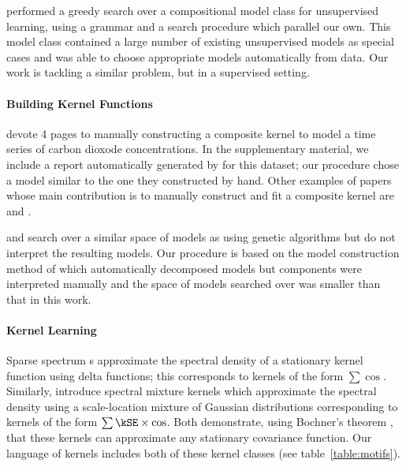 \citet{Grosse2012-zi} performed a greedy search over a compositional model class for unsupervised learning, using a grammar and a search procedure which parallel our own.
This model class contained a large number of existing unsupervised models as special cases and was able to choose appropriate models automatically from data.
Our work is tackling a similar problem, but in a supervised setting.


\paragraph{Building Kernel Functions}
\cite{rasmussen38gaussian} devote 4 pages to manually constructing a composite kernel to model a time series of carbon dioxode concentrations.
In the supplementary material, we include a report automatically generated by \procedurename{} for this dataset; our procedure chose a model similar to the one they constructed by hand.
Other examples of papers whose main contribution is to manually construct and fit a composite \gp{} kernel are \cite{klenske2012nonparametric} and \cite{lloydgefcom2012}.

\citet{diosan2007evolving, bing2010gp} and \citet{kronberger2013evolution} search over a similar space of models as \procedurename{} using genetic algorithms but do not interpret the resulting models.
Our procedure is based on the model construction method of \citet{DuvLloGroetal13} which automatically decomposed models but components were interpreted manually and the space of models searched over was smaller than that in this work.

\paragraph{Kernel Learning}

Sparse spectrum \gp{}s \citep{lazaro2010sparse} approximate the spectral density of a stationary kernel function using delta functions; this corresponds to kernels of the form $\sum \cos$.
Similarly, \citet{WilAda13} introduce spectral mixture kernels which approximate the spectral density using a scale-location mixture of Gaussian distributions corresponding to kernels of the form $\sum \kSE \times \cos$.
Both demonstrate, using Bochner's theorem \citep{bochner1959lectures}, that these kernels can approximate any stationary covariance function.
Our language of kernels includes both of these kernel classes (see table~\ref{table:motifs}).

